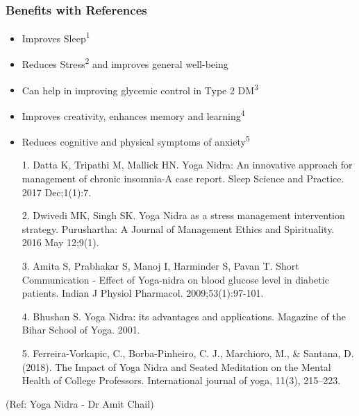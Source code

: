 \begin{frame}[fragile]\frametitle{Benefits with References}


    \begin{itemize}
        \item Improves Sleep\textsuperscript{1}
        \item Reduces Stress\textsuperscript{2} and improves general well-being
        \item Can help in improving glycemic control in Type 2 DM\textsuperscript{3}
        \item Improves creativity, enhances memory and learning\textsuperscript{4}
        \item Reduces cognitive and physical symptoms of anxiety\textsuperscript{5}
    \end{itemize}
    \begin{itemize}
        \item[1.] Datta K, Tripathi M, Mallick HN. Yoga Nidra: An innovative approach for management of chronic insomnia-A case report. Sleep Science and Practice. 2017 Dec;1(1):7.
        \item[2.] Dwivedi MK, Singh SK. Yoga Nidra as a stress management intervention strategy. Purushartha: A Journal of Management Ethics and Spirituality. 2016 May 12;9(1).
        \item[3.] Amita S, Prabhakar S, Manoj I, Harminder S, Pavan T. Short Communication - Effect of Yoga-nidra on blood glucose level in diabetic patients. Indian J Physiol Pharmacol. 2009;53(1):97-101.
        \item[4.] Bhushan S. Yoga Nidra: its advantages and applications. Magazine of the Bihar School of Yoga. 2001.
        \item[5.] Ferreira-Vorkapic, C., Borba-Pinheiro, C. J., Marchioro, M., \& Santana, D. (2018). The Impact of Yoga Nidra and Seated Meditation on the Mental Health of College Professors. International journal of yoga, 11(3), 215–223.
    \end{itemize}
	
		{\tiny (Ref: Yoga Nidra - Dr Amit Chail)}		

\end{frame}

